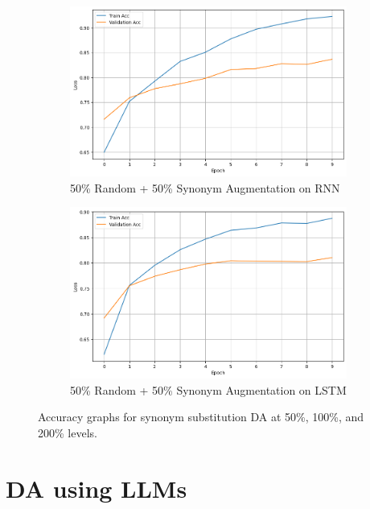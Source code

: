 \documentclass{article}
\begin{document}
\begin{figure}[ht]
  \centering
  \begin{subfigure}[b]{0.45\textwidth}
    \includegraphics[width=\textwidth]{img/hybrid_100_rnn.png}
    \caption{50\% Random + 50\% Synonym Augmentation on RNN}
    \label{fig:hybrid_100_rnn}
  \end{subfigure}
  \hfill
  \begin{subfigure}[b]{0.45\textwidth}
    \includegraphics[width=\textwidth]{img/hybrid_100_lstm.png}
    \caption{50\% Random + 50\% Synonym Augmentation on LSTM}
    \label{fig:hybrid_100_lstm}
  \end{subfigure}
  \caption{Accuracy graphs for synonym substitution DA at 50\%, 100\%, and 200\% levels.}
  \label{fig:hybrid_extreme_substitution_acc}
\end{figure}

\section{DA using LLMs}
\end{document}
